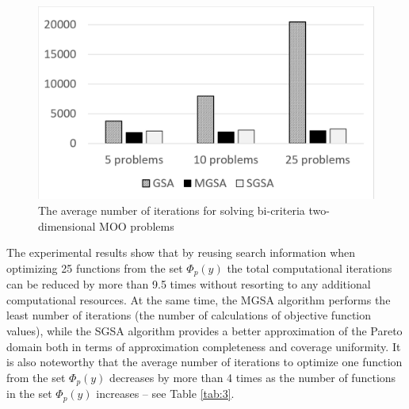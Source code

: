 \documentclass[runningheads]{llncs}
\begin{document}
\begin{figure}
  \centering
  \includegraphics[width=0.7\linewidth]{fig_t2}
  \caption{The average number of iterations for solving bi-criteria two-dimensional MOO problems}
  \label{fig:1}
\end{figure}

The experimental results show that by reusing search information when optimizing 25 functions from the set $\Phi_p (y)$ the total computational iterations can be reduced  by more than 9.5 times without resorting to any additional computational resources. At the same time, the MGSA algorithm performs the least number of iterations (the number of calculations of objective function values), while the SGSA algorithm provides a better approximation of the Pareto domain both in terms of approximation completeness and coverage uniformity. It is also noteworthy that the average number of iterations to optimize one function from the set $\Phi_p (y)$ decreases by more than 4 times as the number of functions in the set $\Phi_p (y)$ increases -- see Table \ref{tab:3}. 
\end{document}

